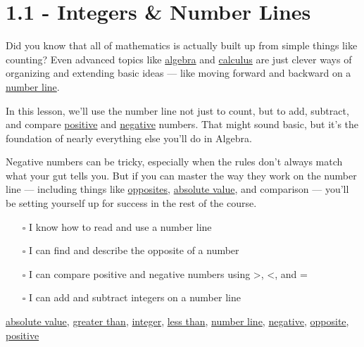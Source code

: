 \documentclass[
  letterpaper,
  DIV=11,
  numbers=noendperiod]{scrreprt}
\providecommand{\tightlist}{%
  \setlength{\itemsep}{0pt}\setlength{\parskip}{0pt}}
\begin{document}
\chapter*{1.1 - Integers \& Number Lines}\label{integers-number-lines}


Did you know that all of mathematics is actually built up from simple
things like counting? Even advanced topics like
\href{./glossary.html\#glossary-algebra}{algebra} and
\href{./glossary.html\#glossary-calculus}{calculus} are just clever ways
of organizing and extending basic ideas --- like moving forward and
backward on a \href{./glossary.html\#glossary-number-line}{number line}.

In this lesson, we'll use the number line not just to count, but to add,
subtract, and compare
\href{./glossary.html\#glossary-positive}{positive} and
\href{./glossary.html\#glossary-negative}{negative} numbers. That might
sound basic, but it's the foundation of nearly everything else you'll do
in Algebra.

Negative numbers can be tricky, especially when the rules don't always
match what your gut tells you. But if you can master the way they work
on the number line --- including things like
\href{./glossary.html\#glossary-opposite}{opposites},
\href{./glossary.html\#glossary-absolute-value}{absolute value}, and
comparison --- you'll be setting yourself up for success in the rest of
the course.

\begin{itemize}
\tightlist
\item[$\square$]
  I know how to read and use a number line
\item[$\square$]
  I can find and describe the opposite of a number
\item[$\square$]
  I can compare positive and negative numbers using \textgreater,
  \textless, and =
\item[$\square$]
  I can add and subtract integers on a number line
\end{itemize}

\href{./glossary.html\#glossary-absolute-value}{absolute value},
\href{./glossary.html\#glossary-greater-than}{greater than},
\href{./glossary.html\#glossary-integer}{integer},
\href{./glossary.html\#glossary-less-than}{less than},
\href{./glossary.html\#glossary-number-line}{number line},
\href{./glossary.html\#glossary-negative}{negative},
\href{./glossary.html\#glossary-opposite}{opposite},
\href{./glossary.html\#glossary-positive}{positive}
\end{document}
